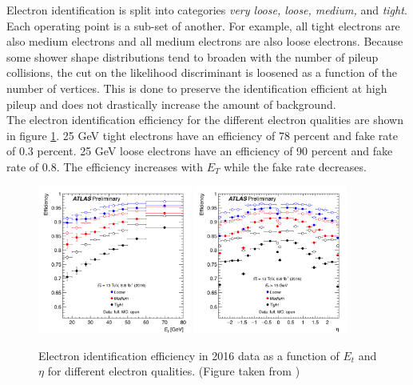 \indent Electron identification is split into categories {\it very loose, loose, medium, } and {\it tight}.  Each operating point is a sub-set of another.  For example, all tight electrons are also medium electrons and all medium electrons are also loose electrons.  Because some shower shape distributions tend to broaden with the number of pileup collisions, the cut on the likelihood discriminant is loosened as a function of the number of vertices. This is done to preserve the identification efficient at high pileup and does not drastically increase the amount of background.\cite{EleID}  \\

\indent The electron identification efficiency for the different electron qualities are shown in figure \ref{fig:elec_eff}.  25 GeV tight electrons have an efficiency of 78 percent and fake rate of 0.3 percent.  25 GeV loose electrons have an efficiency of 90 percent and fake rate of 0.8.  The efficiency increases with $E_T$ while the fake rate decreases.\cite{EleID} \\

\begin{figure}[!hp] 
\begin{center}
\includegraphics[width=0.45\textwidth]{figures/EMCalib/Elec_Et.png}
\includegraphics[width=0.45\textwidth]{figures/EMCalib/Elec_eta.png}
\caption{Electron identification efficiency in 2016 data as a function of $E_t$ and $\eta$ for different electron qualities. (Figure taken from \cite{EleID}) }
\label{fig:elec_eff}
\end{center}
\end{figure}

